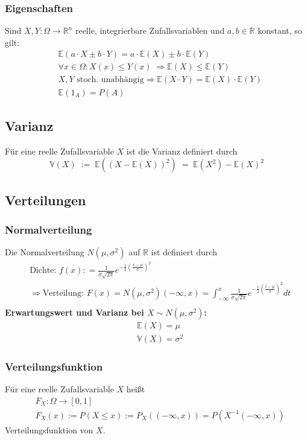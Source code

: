 \documentclass[a4paper]{article}
\begin{document}
\subsubsection{Eigenschaften}
Sind $X,Y : \Omega \to \mathbb{R}^n$   reelle, integrierbare  Zufallsvariablen und $a,b \in \mathbb{R}$ konstant, so gilt:
\begin{align*}
& \mathbb{E}(a \cdot X \pm b \cdot Y) = a \cdot \mathbb{E}(X) \pm b \cdot \mathbb{E}(Y) \\
& \forall x \in \Omega: X(x) \leq Y(x) \;   \Rightarrow \mathbb{E}(X) \leq \mathbb{E}(Y) \\
& X ,Y \text{ stoch. unabhängig} \Rightarrow   \mathbb{E}(X \cdot Y) =  \mathbb{E}(X) \cdot  \mathbb{E}(Y) \\
& \mathbb{E} (1_A) = P (A)
\end{align*}

\subsection{Varianz}
Für eine reelle Zufallsvariable $X$ ist die Varianz definiert durch
$$ \mathbb{V} (X) \; := \;  \mathbb{E}( (X - \mathbb{E}(X))^2) \;  = \; \mathbb{E}(X^2) -  \mathbb{E}(X)^2$$


\subsection{Verteilungen}

\subsubsection{Normalverteilung}
Die Normalverteilung $N{(\mu,\sigma^2)}$ auf $\mathbb{R}$ ist definiert durch
\begin{align*}
& \text{Dichte: } f (x) : = \frac 1{\sigma \sqrt{2\pi}}e^{- \frac {1}{2} (\frac{x- \mu}{ \sigma})^2} \\
&  \Rightarrow \text{Verteilung: } F(x) = N{(\mu,\sigma^2)}(-\infty , x) =  \int_{-\infty}^{x}  \frac 1{\sigma \sqrt{2\pi}}e^{- \frac {1}{2} (\frac{t- \mu}{ \sigma})^2}dt\\
\end{align*}
\textbf{Erwartungswert und Varianz bei $X \sim N(\mu, \sigma^2)$:}
\begin{align*}
& \mathbb{E}(X) = \mu \\
& \mathbb{V}(X) = \sigma^2
\end{align*}

\subsubsection{Verteilungsfunktion}
Für eine reelle Zufallsvariable $X$ heißt 
\begin{align*} 
& F_X : \Omega \to [0,1] \\
& F_X (x) := P (X \leq x) := P_X (( -\infty, x )) = P(X^{-1} (-\infty, x))
\end{align*}
Verteilungsfunktion von $X$.
\end{document}
